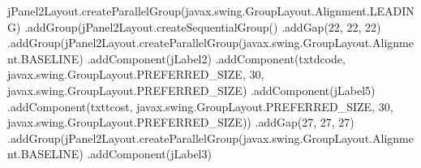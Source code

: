 \documentclass[
  10pt,
]{article}
\newenvironment{Shaded}{}{}
\newcommand{\DecValTok}[1]{\textcolor[rgb]{0.25,0.63,0.44}{#1}}
\newcommand{\FunctionTok}[1]{\textcolor[rgb]{0.02,0.16,0.49}{#1}}
\newcommand{\NormalTok}[1]{#1}
\newcommand{\OperatorTok}[1]{\textcolor[rgb]{0.40,0.40,0.40}{#1}}
\begin{document}
\begin{Shaded}
\begin{Highlighting}[numbers=left,,]
\NormalTok{            jPanel2Layout}\OperatorTok{.}\FunctionTok{createParallelGroup}\OperatorTok{(}\NormalTok{javax}\OperatorTok{.}\FunctionTok{swing}\OperatorTok{.}\FunctionTok{GroupLayout}\OperatorTok{.}\FunctionTok{Alignment}\OperatorTok{.}\FunctionTok{LEADING}\OperatorTok{)}
            \OperatorTok{.}\FunctionTok{addGroup}\OperatorTok{(}\NormalTok{jPanel2Layout}\OperatorTok{.}\FunctionTok{createSequentialGroup}\OperatorTok{()}
                \OperatorTok{.}\FunctionTok{addGap}\OperatorTok{(}\DecValTok{22}\OperatorTok{,} \DecValTok{22}\OperatorTok{,} \DecValTok{22}\OperatorTok{)}
                \OperatorTok{.}\FunctionTok{addGroup}\OperatorTok{(}\NormalTok{jPanel2Layout}\OperatorTok{.}\FunctionTok{createParallelGroup}\OperatorTok{(}\NormalTok{javax}\OperatorTok{.}\FunctionTok{swing}\OperatorTok{.}\FunctionTok{GroupLayout}\OperatorTok{.}\FunctionTok{Alignment}\OperatorTok{.}\FunctionTok{BASELINE}\OperatorTok{)}
                    \OperatorTok{.}\FunctionTok{addComponent}\OperatorTok{(}\NormalTok{jLabel2}\OperatorTok{)}
                    \OperatorTok{.}\FunctionTok{addComponent}\OperatorTok{(}\NormalTok{txtdcode}\OperatorTok{,}\NormalTok{ javax}\OperatorTok{.}\FunctionTok{swing}\OperatorTok{.}\FunctionTok{GroupLayout}\OperatorTok{.}\FunctionTok{PREFERRED\_SIZE}\OperatorTok{,} \DecValTok{30}\OperatorTok{,}\NormalTok{ javax}\OperatorTok{.}\FunctionTok{swing}\OperatorTok{.}\FunctionTok{GroupLayout}\OperatorTok{.}\FunctionTok{PREFERRED\_SIZE}\OperatorTok{)}
                    \OperatorTok{.}\FunctionTok{addComponent}\OperatorTok{(}\NormalTok{jLabel5}\OperatorTok{)}
                    \OperatorTok{.}\FunctionTok{addComponent}\OperatorTok{(}\NormalTok{txttcost}\OperatorTok{,}\NormalTok{ javax}\OperatorTok{.}\FunctionTok{swing}\OperatorTok{.}\FunctionTok{GroupLayout}\OperatorTok{.}\FunctionTok{PREFERRED\_SIZE}\OperatorTok{,} \DecValTok{30}\OperatorTok{,}\NormalTok{ javax}\OperatorTok{.}\FunctionTok{swing}\OperatorTok{.}\FunctionTok{GroupLayout}\OperatorTok{.}\FunctionTok{PREFERRED\_SIZE}\OperatorTok{))}
                \OperatorTok{.}\FunctionTok{addGap}\OperatorTok{(}\DecValTok{27}\OperatorTok{,} \DecValTok{27}\OperatorTok{,} \DecValTok{27}\OperatorTok{)}
                \OperatorTok{.}\FunctionTok{addGroup}\OperatorTok{(}\NormalTok{jPanel2Layout}\OperatorTok{.}\FunctionTok{createParallelGroup}\OperatorTok{(}\NormalTok{javax}\OperatorTok{.}\FunctionTok{swing}\OperatorTok{.}\FunctionTok{GroupLayout}\OperatorTok{.}\FunctionTok{Alignment}\OperatorTok{.}\FunctionTok{BASELINE}\OperatorTok{)}
                    \OperatorTok{.}\FunctionTok{addComponent}\OperatorTok{(}\NormalTok{jLabel3}\OperatorTok{)}

\end{Highlighting}
\end{Shaded}
\end{document}
